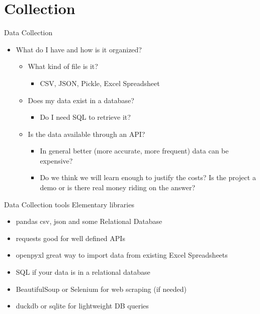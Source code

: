 \documentclass[aspectratio=169]{beamer}
\begin{document}
\section{Collection}
\label{sec:org5af6bba}
\begin{frame}[label={sec:org0fac196}]{Data Collection}
\begin{itemize}
\item What do I have and how is it organized?
\begin{itemize}
\item What kind of file is it?
\begin{itemize}
\item CSV, JSON, Pickle, Excel Spreadsheet
\end{itemize}
\item Does my data exist in a database?
\begin{itemize}
\item Do I need SQL to retrieve it?
\end{itemize}
\item Is the data available through an API?
\begin{itemize}
\item In general better (more accurate, more frequent) data can be
expensive?
\item Do we think we will learn enough to justify the costs? Is the
project a demo or is there real money riding on the answer?
\end{itemize}
\end{itemize}
\end{itemize}
\end{frame}

\begin{frame}[label={sec:orgdfb935d}]{Data Collection tools}
Elementary libraries
\begin{itemize}
\item \alert{pandas} csv, json and some Relational Database
\item \alert{requests} good for well defined APIs
\item \alert{openpyxl} great way to import data from existing Excel Spreadsheets
\item \alert{SQL} if your data is in a relational database
\item \alert{BeautifulSoup} or \alert{Selenium} for web scraping (if needed)
\item \alert{duckdb} or \alert{sqlite} for lightweight DB queries
\end{itemize}
\end{frame}
\end{document}

